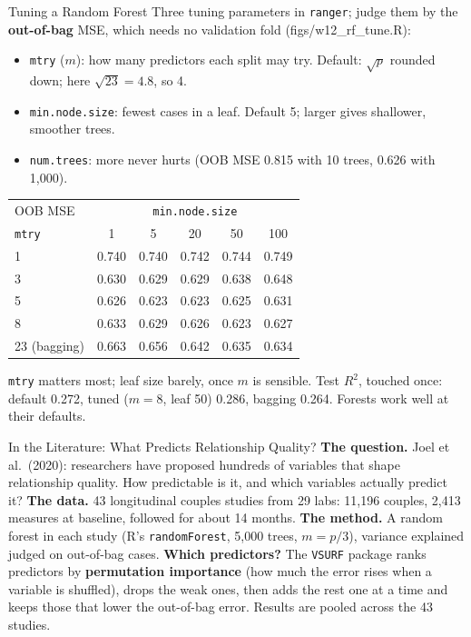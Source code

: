 \documentclass[aspectratio=169,11pt,xcolor=dvipsnames]{beamer}
\newcommand{\srcp}[1]{{\scriptsize\color{gray}(#1)}}
\begin{document}
\begin{frame}{Tuning a Random Forest}
Three tuning parameters in \texttt{ranger}; judge them by the \textbf{out-of-bag} MSE, which needs no
validation fold \srcp{figs/w12\_rf\_tune.R}:
\begin{itemize}\itemsep1pt\small
  \item \texttt{mtry} ($m$): how many predictors each split may try. Default: $\sqrt p$ rounded down; here $\sqrt{23} = 4.8$, so 4.
  \item \texttt{min.node.size}: fewest cases in a leaf. Default 5; larger gives shallower, smoother trees.
  \item \texttt{num.trees}: more never hurts (OOB MSE 0.815 with 10 trees, 0.626 with 1,000).
\end{itemize}
\vskip-2pt
\begin{center}\footnotesize
\renewcommand{\arraystretch}{0.95}
\begin{tabular}{@{}lccccc@{}}
\toprule
OOB MSE & \multicolumn{5}{c}{\texttt{min.node.size}} \\
\texttt{mtry} & 1 & 5 & 20 & 50 & 100 \\
\midrule
1 & 0.740 & 0.740 & 0.742 & 0.744 & 0.749 \\
3 & 0.630 & 0.629 & 0.629 & 0.638 & 0.648 \\
5 & 0.626 & \alert{0.623} & 0.623 & 0.625 & 0.631 \\
8 & 0.633 & 0.629 & 0.626 & \alert{0.623} & 0.627 \\
23 (bagging) & 0.663 & 0.656 & 0.642 & 0.635 & 0.634 \\
\bottomrule
\end{tabular}
\end{center}
\vskip-1pt
{\small \texttt{mtry} matters most; leaf size barely, once $m$ is sensible. Test $R^2$, touched once:
default 0.272, tuned ($m = 8$, leaf 50) 0.286, bagging 0.264. Forests work well at their defaults.}
\end{frame}

\begin{frame}{In the Literature: What Predicts Relationship Quality?}
\textbf{The question.} Joel et al.\ (2020): researchers have proposed hundreds of variables that shape relationship
quality. How predictable is it, and which variables actually predict it?
\vskip2pt
\textbf{The data.} 43 longitudinal couples studies from 29 labs: 11,196 couples, 2,413 measures at
baseline, followed for about 14 months.
\vskip2pt
\textbf{The method.} A \alert{random forest} in each study (R's \texttt{randomForest}, 5,000 trees,
$m = p/3$), variance explained judged on out-of-bag cases.
\vskip2pt
\textbf{Which predictors?} The \texttt{VSURF} package ranks predictors by \textbf{permutation importance}
(how much the error rises when a variable is shuffled), drops the weak ones, then adds the rest one at
a time and keeps those that lower the out-of-bag error. Results are pooled across the 43 studies.
\end{frame}
\end{document}
